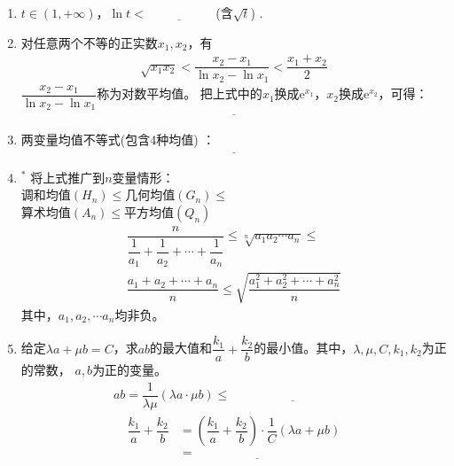 \documentclass{article}
\newif\ifte
\newcommand{\e}{\mathrm{e}}
\renewcommand\leq\leqslant
\begin{document}
\begin{multicols}{2}
\begin{enumerate}[leftmargin=20pt]
\item $ t\in(1,+\infty) $，$ \ln t<\underline{\ \ifte 
    \sqrt{t}-\dfrac{1}{\sqrt{t}} \else \hspace{2cm} \fi\ } $
\ifte \else (含$ \sqrt{t} $) \fi.

\item 对任意两个不等的正实数$ x_1,x_2 $，有
\begin{align*}
    \sqrt{x_1x_2}<\dfrac{x_2-x_1}{\ln x_2-\ln x_1}<\dfrac{x_1+x_2}{2}
\end{align*}
$ \dfrac{x_2-x_1}{\ln x_2-\ln x_1} $称为对数平均值。
把上式中的$ x_1 $换成$ \e^{x_1} $，$ x_2 $换成$ \e^{x_2} $，可得：
\begin{align*}
    \underline{\ \ifte\e^{\frac{x_1+x_2}{2}}<\dfrac{\e^{x_2}
    -\e^{x_1}}{x_2-x_1}<\dfrac{\e^{x_1}+\e^{x_2}}{2}
    \else \hspace{7cm} \fi\ }
\end{align*}

\item 两变量均值不等式\ifte \else (包含4种均值) \fi：
\begin{align*}
    \underline{\ \ifte \dfrac{2}{\dfrac{1}{a}+\dfrac{1}{b}}\leq 
    \sqrt{ab} \leq \dfrac{a+b}{2}
    \leq \sqrt{\dfrac{a^2+b^2}{2}}\else \hspace{7cm} \fi\ }
\end{align*}

\item $^*$ 将上式推广到$ n $变量情形：\\
调和均值$(H_n) \leq $几何均值$(G_n) \leq $ \\
算术均值$(A_n) \leq $平方均值$ (Q_n) $
\begin{gather*}
    \dfrac{n}{\dfrac{1}{a_1}+\dfrac{1}{a_2}+\cdots +\dfrac{1}{a_n}}\leq 
    \sqrt[n]{a_1a_2\cdots a_n} \leq \\ \dfrac{a_1+a_2+\cdots +a_n}{n} \leq 
    \sqrt{\dfrac{a_1^2+a_2^2+\cdots +a_n^2}{n}}
\end{gather*}
其中，$ a_1,a_2,\cdots a_n $均非负。

\item 给定$ \lambda a+\mu b=C $，求$ ab $的最大值和$ \dfrac{k_1}{a}+
\dfrac{k_2}{b} $的最小值。其中，$ \lambda,\mu,C,k_1,k_2 $为正的常数，
$ a,b $为正的变量。
\begin{gather*}
    ab=\dfrac{1}{\lambda\mu}(\lambda a\cdot \mu b)\leq 
   \underline{\ \ifte \dfrac{1}{\lambda\mu}\left(\dfrac{\lambda a
   +\mu b}{2}\right)^2=\dfrac{C^2}{4\lambda\mu}\else \hspace{4cm} \fi\ } 
\end{gather*}
\begin{align*}
    \dfrac{k_1}{a}+\dfrac{k_2}{b} &=\left(\dfrac{k_1}{a}+
    \dfrac{k_2}{b}\right)\cdot
    \dfrac{1}{C}\left(\lambda a+\mu b\right)\\ &=\underline{\ \ifte 
    \dfrac{1}{C}\left(k_1\lambda +k_2\mu +k_1\mu \dfrac{b}{a}+k_2
    \lambda \dfrac{a}{b}\right)\else \hspace{4cm} \fi\ } 
\end{align*}


\end{enumerate}
\end{multicols}
\end{document}
